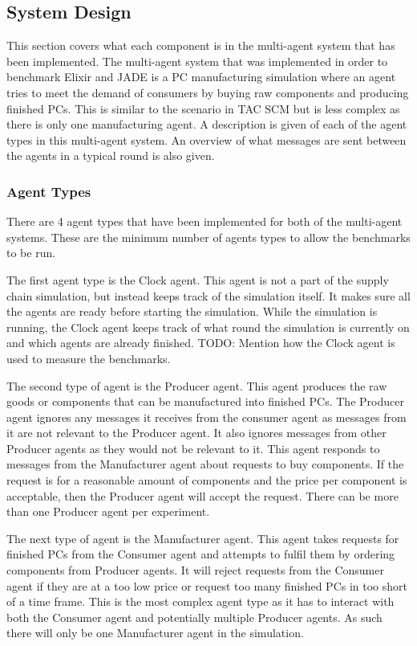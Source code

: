 \subsection{System Design}

This section covers what each component is in the multi-agent system that has been implemented.
The multi-agent system that was implemented in order to benchmark Elixir and JADE is a PC manufacturing simulation where an agent tries to meet the demand of consumers by buying raw components and producing finished PCs.
This is similar to the scenario in TAC SCM but is less complex as there is only one manufacturing agent.
A description is given of each of the agent types in this multi-agent system.
An overview of what messages are sent between the agents in a typical round is also given.

\subsubsection{Agent Types}

There are 4 agent types that have been implemented for both of the multi-agent systems.
These are the minimum number of agents types to allow the benchmarks to be run.

The first agent type is the Clock agent.
This agent is not a part of the supply chain simulation, but instead keeps track of the simulation itself.
It makes sure all the agents are ready before starting the simulation.
While the simulation is running, the Clock agent keeps track of what round the simulation is currently on and which agents are already finished.
TODO\@: Mention how the Clock agent is used to measure the benchmarks.

The second type of agent is the Producer agent.
This agent produces the raw goods or components that can be manufactured into finished PCs.
The Producer agent ignores any messages it receives from the consumer agent as messages from it are not relevant to the Producer agent.
It also ignores messages from other Producer agents as they would not be relevant to it.
This agent responds to messages from the Manufacturer agent about requests to buy components.
If the request is for a reasonable amount of components and the price per component is acceptable, then the Producer agent will accept the request.
There can be more than one Producer agent per experiment.

The next type of agent is the Manufacturer agent.
This agent takes requests for finished PCs from the Consumer agent and attempts to fulfil them by ordering components from Producer agents.
It will reject requests from the Consumer agent if they are at a too low price or request too many finished PCs in too short of a time frame.
This is the most complex agent type as it has to interact with both the Consumer agent and potentially multiple Producer agents.
As such there will only be one Manufacturer agent in the simulation.

